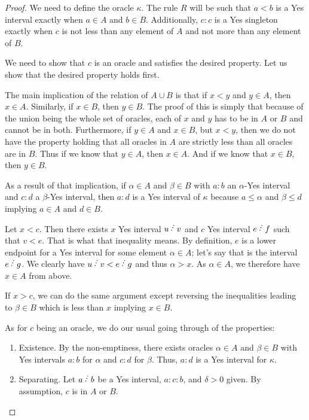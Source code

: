 \documentclass[12pt]{article}
\begin{document}
\begin{proof}
    We need to define the oracle $\kappa$. The rule $R$ will be such that $a \lt b$ is a Yes interval exactly when $a\in A$ and $b \in B$. Additionally, $c:c$ is a Yes singleton exactly when $c$ is not less than any element of $A$ and not more than any element of $B$. 

    We need to show that $c$ is an oracle and satisfies the desired property. Let us show that the desired property holds first. 

    The main implication of the relation of $A \cup B$ is that if $x < y$ and $y \in A$, then $x \in A$. Similarly, if $x \in B$, then $y \in B$. The proof of this is simply that because of the union being the whole set of oracles, each of $x$ and $y$ has to be in $A$ or $B$ and cannot be in both. Furthermore, if $y \in A$ and $x \in B$, but $x < y$, then we do not have the property holding that all oracles in $A$ are strictly less than all oracles are in $B$. Thus if we know that $y \in A$, then $x \in A$. And if we know that $x \in B$, then $y \in B$.

    As a result of that implication, if $\alpha \in A$ and $\beta \in B$ with $a:b$ an $\alpha$-Yes interval and $c:d$ a $\beta$-Yes interval, then $a:d$ is a Yes interval of $\kappa$ because $a \leq \alpha$ and $\beta \leq d$ implying $a \in A$ and $d \in B$. 

    Let $ x < c$. Then there exists $x$ Yes interval $u\lte v$ and $c$ Yes interval $e\lte f$ such that $v < e$. That is what that inequality means. By definition, $e$ is a lower endpoint for a Yes interval for some element $\alpha \in A$; let's say that is the interval $e\lte g$. We clearly have $ u \lte v < e \lte g$ and thus $\alpha > x$. As $\alpha \in A$, we therefore have $x \in A$ from above. 

    If $x > c$, we can do the same argument except reversing the inequalities leading to $\beta \in B$ which is less than $x$ implying $x \in B$.

    As for $c$ being an oracle, we do our usual going through of the properties: 
    \begin{enumerate}
        \item Existence. By the non-emptiness, there exists oracles $\alpha \in A$ and $\beta \in B$ with Yes intervals $a:b$ for $\alpha$ and $c:d$ for $\beta$. Thus, $a:d$ is a Yes interval for $\kappa$. 
        \item Separating. Let $a\lte b$ be a Yes interval, $a:c:b$, and $\delta >0 $ given.  By assumption, $c$ is in $A$ or $B$. 
        

\end{enumerate}
\end{proof}
\end{document}

